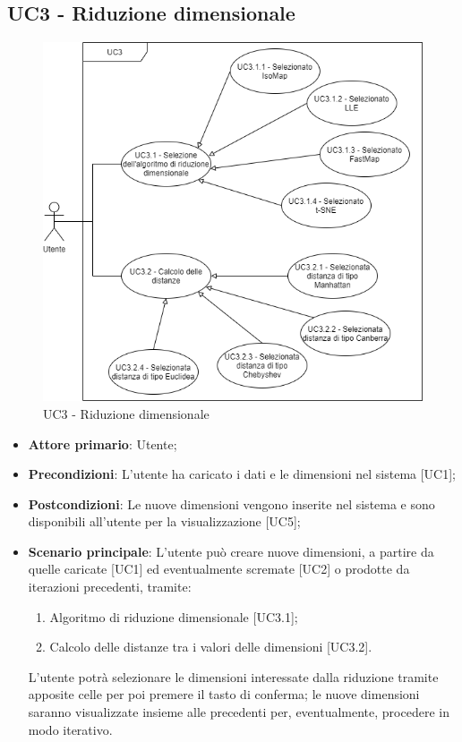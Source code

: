 \subsection{UC3 - Riduzione dimensionale}
\begin{figure}[h]
\includegraphics[width=14cm]{section/Images/UC3.png}
\centering
\caption{UC3 - Riduzione dimensionale}
\end{figure}
\begin{itemize}
	\item \textbf{Attore primario}: Utente;
	\item \textbf{Precondizioni}: L'utente ha caricato i dati e le dimensioni nel sistema [UC1];
	\item \textbf{Postcondizioni}: Le nuove dimensioni vengono inserite nel sistema e sono disponibili all'utente per la visualizzazione [UC5];
	\item \textbf{Scenario principale}: L'utente può creare nuove dimensioni, a partire da quelle caricate [UC1] ed eventualmente scremate [UC2] o prodotte da iterazioni precedenti, tramite:
	\begin{enumerate}[1.]
		\item Algoritmo di riduzione dimensionale [UC3.1];
		\item Calcolo delle distanze tra i valori delle dimensioni [UC3.2].
	\end{enumerate}
	L'utente potrà selezionare le dimensioni interessate dalla riduzione tramite apposite celle per poi premere il tasto di conferma; le nuove dimensioni saranno visualizzate insieme alle precedenti per, eventualmente, procedere in modo iterativo.
\end{itemize}